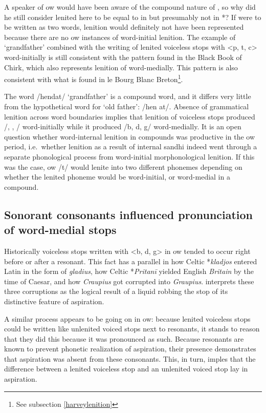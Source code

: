 A speaker of \gls{ow} would have been aware of the compound nature of , so why did he still consider lenited  here to be equal to  in  but presumably not in *? If  were to be written as two words, lenition would definitely not have been represented because there are no \gls{ow} instances of word-initial lenition. The example of  `grandfather' combined with the writing of lenited voiceless stops with <p, t, c> word-initially is still consistent with the pattern found in the Black Book of Chirk, which also represents lenition of  word-medially. This pattern is also consistent with what is found in le Bourg Blanc Breton\footnote{See subsection \ref{harveylenition}}. 

The word  /hendat/ `grandfather' is a compound word, and it differs very little from the hypothetical word for `old father':  /hen \dd at/. Absence of grammatical lenition across word boundaries implies that lenition of voiceless stops produced /\bd, \dd, \gd/ word-initially while it produced /b, d, g/ word-medially. It is an open question whether word-internal lenition in compounds was  productive in the \gls{ow} period, i.e.\ whether lenition as a result of internal sandhi indeed went through a separate phonological process from word-initial morphonological lenition. If this was the case, \gls{ow} /t/ would lenite into two different phonemes depending on whether the lenited phoneme would be word-initial, or word-medial in a compound. 

\subsection{Sonorant consonants influenced pronunciation of word-medial stops}
Historically voiceless stops written with <b, d, g> in \gls{ow} tended to occur right before or after a resonant. This fact has a parallel in how Celtic *\textit{kladjos} entered Latin in the form of \textit{gladius}, how Celtic *\textit{Pritanī} yielded English \textit{Britain} by the time of Caesar, and how \textit{Craupius} got corrupted into \textit{Graupius}. \textcite[\S 25]{koch_*cothairche_1990} interprets these three corruptions as the logical result of a liquid robbing the stop of its distinctive feature of aspiration.

A similar process appears to be going on in \gls{ow}: because lenited voiceless stops could be written like unlenited voiced stops next to resonants, it stands to reason that they did this because it was pronounced as such. Because resonants are known to prevent phonetic realization of aspiration, their presence demonstrates that  aspiration was absent from these consonants. This, in turn, imples that the difference between a lenited voiceless stop and an unlenited voiced stop lay in aspiration.

